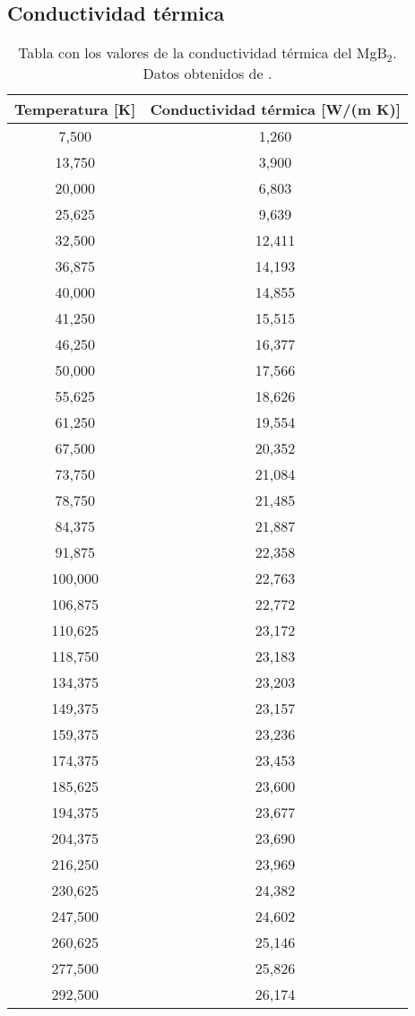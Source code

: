 \subsection*{Conductividad térmica}
\begin{table}[h!]
  \centering
  \begin{tabular}{|c|c|}\hline
	Temperatura [K]	&	Conductividad térmica [W/(m K)]	\\ \hline
	7,500	&	1,260	\\
	13,750	&	3,900	\\
	20,000	&	6,803	\\
	25,625	&	9,639	\\
	32,500	&	12,411	\\
	36,875	&	14,193	\\
	40,000	&	14,855	\\
	41,250	&	15,515	\\
	46,250	&	16,377	\\
	50,000	&	17,566	\\
	55,625	&	18,626	\\
	61,250	&	19,554	\\
	67,500	&	20,352	\\
	73,750	&	21,084	\\
	78,750	&	21,485	\\
	84,375	&	21,887	\\
	91,875	&	22,358	\\
	100,000	&	22,763	\\
	106,875	&	22,772	\\
	110,625	&	23,172	\\
	118,750	&	23,183	\\
	134,375	&	23,203	\\
	149,375	&	23,157	\\
	159,375	&	23,236	\\
	174,375	&	23,453	\\
	185,625	&	23,600	\\
	194,375	&	23,677	\\
	204,375	&	23,690	\\
	216,250	&	23,969	\\
	230,625	&	24,382	\\
	247,500	&	24,602	\\
	260,625	&	25,146	\\
	277,500	&	25,826	\\
	292,500	&	26,174	\\ \hline
  \end{tabular}
  \caption[Tabla con los valores de la conductividad térmica del MgB$_2$.]{Tabla con los valores de la conductividad térmica del MgB$_2$. Datos obtenidos de \cite{Putti2003}.}
  \label{tab:kmgb2}
\end{table}
\newpage
